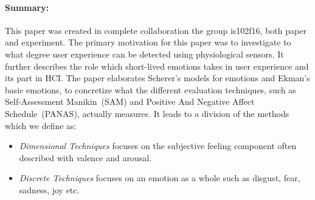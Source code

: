 \paragraph{Summary:}

This paper was created in complete collaboration the group is102f16, both paper and experiment.
The primary motivation for this paper was to investigate to what degree user experience can be detected using physiological sensors.
It further describes the role which short-lived emotions takes in user experience and its part in HCI.
The paper elaborates Scherer's\cite{definition_emotions} models for emotions and Ekman's basic emotions\cite{basic_emotion_origin}, to concretize what the different evaluation techniques, such as Self-Assessment Manikin~(SAM) and Positive And Negative Affect Schedule~(PANAS)\cite{PANAS}, actually measures. It leads to a division of the methods which we define as:
\begin{itemize}
\item \textit{Dimensional Techniques} focuses on the subjective feeling component often described with valence and arousal.
\item \textit{Discrete Techniques} focuses on an emotion as a whole such as disgust, fear, sadness, joy etc.
\end{itemize}
